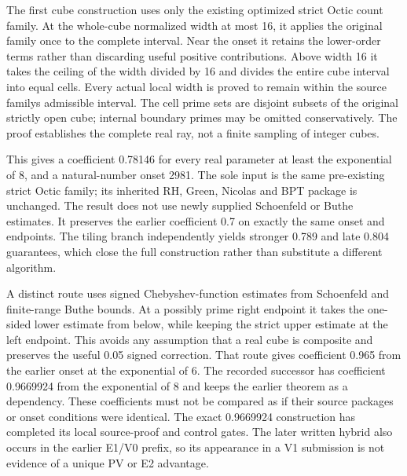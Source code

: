 \documentclass[11pt]{article}
\begin{document}
The first cube construction uses only the existing optimized strict Octic count family. At the whole-cube normalized width at most 16, it applies the original family once to the complete interval. Near the onset it retains the lower-order terms rather than discarding useful positive contributions. Above width 16 it takes the ceiling of the width divided by 16 and divides the entire cube interval into equal cells. Every actual local width is proved to remain within the source familys admissible interval. The cell prime sets are disjoint subsets of the original strictly open cube; internal boundary primes may be omitted conservatively. The proof establishes the complete real ray, not a finite sampling of integer cubes.


This gives a coefficient 0.78146 for every real parameter at least the exponential of 8, and a natural-number onset 2981. The sole input is the same pre-existing strict Octic family; its inherited RH, Green, Nicolas and BPT package is unchanged. The result does not use newly supplied Schoenfeld or Buthe estimates. It preserves the earlier coefficient 0.7 on exactly the same onset and endpoints. The tiling branch independently yields stronger 0.789 and late 0.804 guarantees, which close the full construction rather than substitute a different algorithm.


A distinct route uses signed Chebyshev-function estimates from Schoenfeld and finite-range Buthe bounds. At a possibly prime right endpoint it takes the one-sided lower estimate from below, while keeping the strict upper estimate at the left endpoint. This avoids any assumption that a real cube is composite and preserves the useful 0.05 signed correction. That route gives coefficient 0.965 from the earlier onset at the exponential of 6. The recorded successor has coefficient 0.9669924 from the exponential of 8 and keeps the earlier theorem as a dependency. These coefficients must not be compared as if their source packages or onset conditions were identical. The exact 0.9669924 construction has completed its local source-proof and control gates. The later written hybrid also occurs in the earlier E1/V0 prefix, so its appearance in a V1 submission is not evidence of a unique PV or E2 advantage.


\begin{center}


\ifdim\wd\eqbox>\linewidth\resizebox{\linewidth}{!}{\usebox{\eqbox}}\else\usebox{\eqbox}\fi

\end{center}
\end{document}
